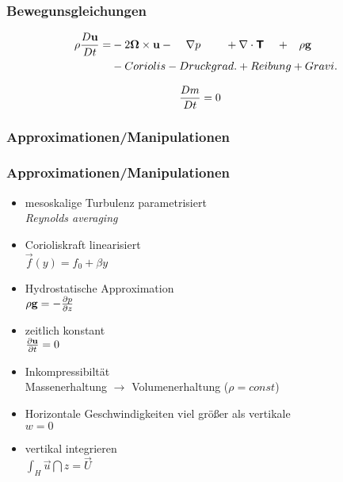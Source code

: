 \begin{frame}
\frametitle{Bewegunsgleichungen}
\begin{align}
	\rho \frac{D\mathbf{\bm{u}}}{Dt} 
	=
	&- 2\mathbf{\bm{\Omega}} \times \mathbf{\bm{u}} -\;\;\;\;\nabla p  \;\;\;\;\;\;\;\;    + \nabla \cdot\boldsymbol{\mathsf{T}}\;\;\;\; +\;\;\; \rho\mathbf{\bm{g}} \nonumber \\
	&-      Coriolis                -    Druckgrad.+             Reibung                 +   Gravi. 
\end{align}

\begin{align}
	\frac{Dm}{Dt}
	&=
	0
\end{align}

\end{frame}



\begin{frame}[noframenumber]
\frametitle{Approximationen/Manipulationen}
\end{frame}
\begin{frame}
\frametitle{Approximationen/Manipulationen}
\begin{itemize}
	\item<1-> 
	mesoskalige Turbulenz parametrisiert \\
	\textit{Reynolds averaging}
	\item<2-> 
	Corioliskraft linearisiert\\
	 $\vec{f}(y) = f_{0} + \beta y$
	\item<3->
	Hydrostatische Approximation \\
	$\rho\mathbf{\bm{g}} = -\frac{\partial p}{\partial z}$ %
	\item<4->
	zeitlich konstant \\
	$\frac{\partial\mathbf{\bm{u}}}{\partial t} = 0$
	\item<5->
	Inkompressibiltät \\
	Massenerhaltung $\rightarrow$ Volumenerhaltung ($\rho = const$)
	\item<6->
	Horizontale Geschwindigkeiten viel größer als vertikale \\
	$w=0$
	\item<7->
	vertikal integrieren \\
	$\int_{H} \vec{u} \dint{z}=	\vec{U}$
\end{itemize}
\end{frame}

